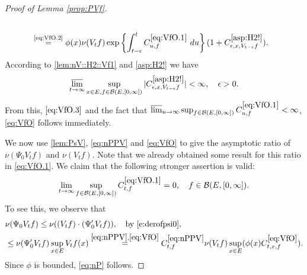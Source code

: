 \documentclass[12pt,a4paper]{amsart}
\numberwithin{equation}{section}
\theoremstyle{plain}
\theoremstyle{definition}
\theoremstyle{remark}
\begin{document}
\begin{proof}[Proof of Lemma \ref{prop:PVf}]
\begin{align}
	\\& \label{eq:VfO.3}\overset{\text{\eqref{eq:VfO.2}}}= \phi(x)\nu(V_{t}f)\exp\left\{ \int_{t-\epsilon}^t C^{\eqref{eq:VfO.1}}_{u,f} ~du\right\} (1+C_{\epsilon,x, V_{t-\epsilon} f}^{\eqref{asp:H2!}} ).
\end{align}
	According to \eqref{lem:nV::H2::Vf1}  and \eqref{asp:H2!} we have
\begin{equation}	
	\varlimsup_{t\to \infty}\sup_{x\in E, f\in \mathcal B(E,[0,\infty])}
	|C_{\epsilon,x, V_{t-\epsilon} f}^{\eqref{asp:H2!}}| < \infty, \quad \epsilon > 0.
\end{equation}
	From this, $\eqref{eq:VfO.3}$ and the fact that $\varlimsup_{u\to \infty} \sup_{f\in \mathcal B(E,[0,\infty])} C^{\eqref{eq:VfO.1}}_{u,f}  < \infty$,
	\eqref{eq:VfO} follows immediately.
	
	We now use \eqref{lem:PsV}, \eqref{eq:nPPV} and \eqref{eq:VfO} to give the asymptotic ratio of $\nu(\Psi_0V_tf)$ and $\nu(V_tf)$.
	Note that we already obtained some result for this ratio in \eqref{eq:VfO.1}.
	We claim that the following stronger assertion is valid:
\begin{equation}\label{eq:nP}
	\lim_{t\to \infty}\sup_{f\in \mathcal B(E,[0,\infty])} C^{\eqref{eq:VfO.1}}_{t,f} = 0,
	\quad f\in \mathcal B(E,[0,\infty]).
\end{equation}
	To see this, we observe that
\begin{align}
	&\nu(\Psi_0 V_tf)
	\leq \nu((V_tf)\cdot (\Psi_0' V_tf)) ,\quad\text{by \eqref{e:derofpsi0}},
	\\&  \leq  \nu(\Psi_0' V_tf) \sup_{x\in E}V_tf(x)
	\overset{\eqref{eq:nPPV},\eqref{eq:VfO}}=   C^{\eqref{eq:nPPV}}_{t,f} \nu(V_tf) \sup_{x\in E} (\phi(x) C^{\eqref{eq:VfO}}_{t,x,f}).
\end{align}
	Since $\phi$ is bounded, \eqref{eq:nP} follows.
	

\end{proof}
\end{document}
